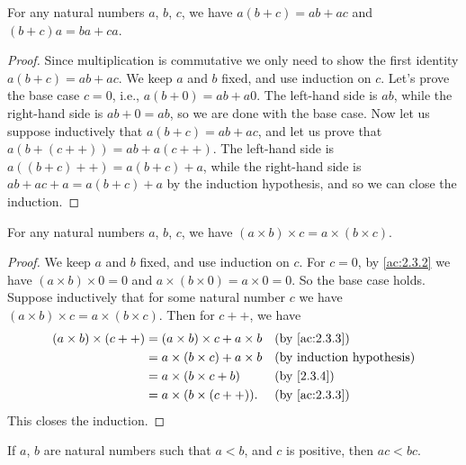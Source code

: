 \begin{prop}\label{2.3.4}
  For any natural numbers \(a\), \(b\), \(c\), we have \(a(b + c) = ab + ac\) and \((b + c)a = ba + ca\).
\end{prop}

\begin{proof}
  Since multiplication is commutative we only need to show the first identity \(a(b + c) = ab + ac\).
  We keep \(a\) and \(b\) fixed, and use induction on \(c\).
  Let's prove the base case \(c = 0\), i.e., \(a(b + 0) = ab + a0\).
  The left-hand side is \(ab\), while the right-hand side is \(ab + 0 = ab\), so we are done with the base case.
  Now let us suppose inductively that \(a(b + c) = ab + ac\), and let us prove that \(a(b + (c++)) = ab + a(c++)\).
  The left-hand side is \(a((b + c)++) = a(b + c) + a\), while the right-hand side is \(ab + ac + a = a(b + c) + a\) by the induction hypothesis, and so we can close the induction.
\end{proof}

\begin{prop}\label{2.3.5}
  For any natural numbers \(a\), \(b\), \(c\), we have \((a \times b) \times c = a \times (b \times c)\).
\end{prop}

\begin{proof}
  We keep \(a\) and \(b\) fixed, and use induction on \(c\).
  For \(c = 0\), by \cref{ac:2.3.2} we have \((a \times b) \times 0 = 0\) and \(a \times (b \times 0) = a \times 0 = 0\).
  So the base case holds.
  Suppose inductively that for some natural number \(c\) we have \((a \times b) \times c = a \times (b \times c)\).
  Then for \(c++\), we have
  \begin{align*}
    (a \times b) \times (c++) & = (a \times b) \times c + a \times b &  & \text{(by \cref{ac:2.3.3})} \\
                              & = a \times (b \times c) + a \times b &  & \byIH                       \\
                              & = a \times (b \times c + b)          &  & \by{2.3.4}                  \\
                              & = a \times (b \times (c++)).         &  & \text{(by \cref{ac:2.3.3})}
  \end{align*}
  This closes the induction.
\end{proof}

\begin{prop}\label{2.3.6}
  If \(a\), \(b\) are natural numbers such that \(a < b\), and \(c\) is positive, then \(ac < bc\).
\end{prop}

